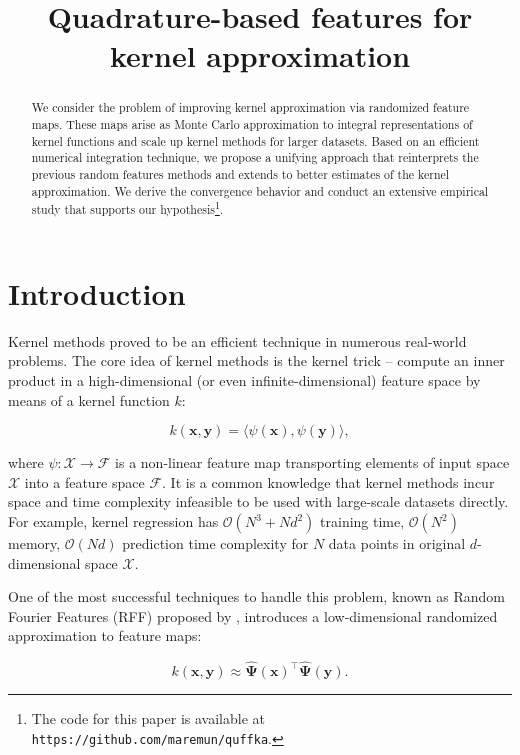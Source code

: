 \title{Quadrature-based features for kernel approximation}

\begin{abstract}
We consider the problem of improving kernel approximation via randomized feature maps. These maps arise as Monte Carlo approximation to integral representations of kernel functions and scale up kernel methods for larger datasets. Based on an efficient numerical integration technique, we propose a unifying approach that reinterprets the previous random features methods and extends to better estimates of the kernel approximation. We derive the convergence behavior and conduct an extensive empirical study that supports our hypothesis\footnote{The code for this paper is available at \texttt{https://github.com/maremun/quffka}.}.
\end{abstract}

\section{Introduction}
Kernel methods proved to be an efficient technique in numerous real-world problems. The core idea of kernel methods is the kernel trick -- compute an inner product in a high-dimensional (or even infinite-dimensional) feature space by means of a kernel function $k$:

\begin{equation}
\label{eq:kernel_scalar_product}
k(\mathbf{x}, \mathbf{y}) = \langle \psi(\mathbf{x}), \psi(\mathbf{y}) \rangle,
\end{equation}

where $\psi: \mathcal{X} \rightarrow \mathcal{F}$ is a non-linear feature map transporting elements of input space
$\mathcal{X}$ 
into a feature space $\mathcal{F}$. 
It is a common knowledge that kernel methods incur space and time complexity infeasible to be used with large-scale datasets directly. For example, kernel regression has $\mathcal{O}(N^3 + Nd^2)$ training time, $\mathcal{O}(N^2)$ memory, $\mathcal{O}(Nd)$ prediction time complexity for $N$ data points in original $d$-dimensional space $\mathcal{X}$.

One of the most successful techniques to handle this problem, known as Random Fourier Features (RFF) proposed by \citep{rahimi2008random}, introduces a low-dimensional randomized approximation to feature maps:

\begin{equation}
\label{eq:inner}
k(\mathbf{x, y}) \approx \mathbf{\hat{\Psi}}(\mathbf{x})^{\boldsymbol{\top}} \mathbf{\hat{\Psi}}(\mathbf{y}).
\end{equation}

